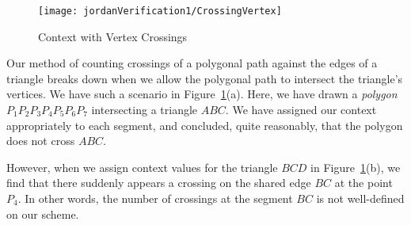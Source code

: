 \begin{figure}
\centering\texttt{[image: jordanVerification1/CrossingVertex]}
\caption{Context with Vertex Crossings}
\label{fig:CrossingVertex}
\end{figure}

Our method of counting crossings of a polygonal path against the edges of a triangle breaks down when we allow the polygonal path to intersect the triangle's vertices. We have such a scenario in Figure~\ref{fig:CrossingVertex}(a). Here, we have drawn a \emph{polygon} $P_1P_2P_3P_4P_5P_6P_7$ intersecting a triangle $ABC$. We have assigned our context appropriately to each segment, and concluded, quite reasonably, that the polygon does not cross $ABC$. 

However, when we assign context values for the triangle $BCD$ in Figure~\ref{fig:CrossingVertex}(b), we find that there suddenly appears a crossing on the shared edge $BC$ at the point $P_4$. In other words, the number of crossings at the segment $BC$ is not well-defined on our scheme.






